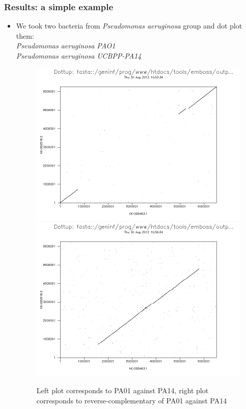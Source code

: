 \documentclass[svgnames,14pt]{beamer}
\begin{document}
\begin{frame}
\frametitle{Results: a simple example}
\begin{itemize}
\item We took two bacteria from \textit{Pseudomonas aeruginosa} group and dot plot them: \\
\textit{Pseudomonas aeruginosa PAO1} \\
\textit{Pseudomonas aeruginosa UCBPP-PA14} \\
\begin{changemargin}{-1.cm}{-1.cm}
\begin{figure}
\centering
\includegraphics[scale = 0.20]{PA01POS_PA14POS.png}
\includegraphics[scale = 0.20]{PA01NEG_PA14POS.png}
\small \caption{Left plot corresponds to PA01 against PA14, right plot corresponds to reverse-complementary of PA01 against PA14}
\end{figure}
\end{changemargin}
\end{itemize}
\end{frame}
\end{document}
